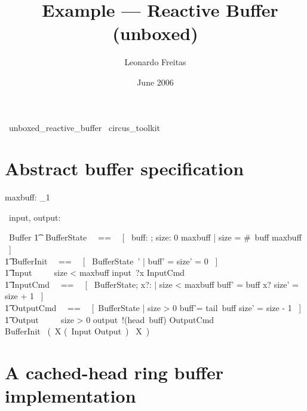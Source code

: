 \documentclass{article}
\begin{document}
\title{\Circus\ Example --- Reactive Buffer (unboxed)}
\author{Leonardo Freitas}
\date{June 2006}

\maketitle

\begin{zsection}
  \SECTION\ unboxed\_reactive\_buffer \parents\ circus\_toolkit
\end{zsection}

\section{Abstract buffer specification}

\begin{axdef}
  maxbuff: \nat_1
\end{axdef}

\begin{circus}
   \circchannel\ input, output: \nat
\end{circus}

\begin{circus}
  \circprocess\ Buffer \circdef \circbegin
  \also %
    \t1 \circstate\ BufferState ~~==~~ [~ buff: \seq \nat; size: 0 \upto maxbuff | size = \#~buff \leq maxbuff ~] \\ %
    \t1 BufferInit ~~==~~ [~ BufferState~' | buff' = \langle\rangle \land size' = 0 ~] \\
    \t1 Input ~~\circdef~~ \lcircguard size < maxbuff \rcircguard \circguard input~?x \then InputCmd \\
    \t1 InputCmd ~~==~~ [~ \Delta BufferState; x?: \nat | size < maxbuff \land buff' = buff \cat \langle x? \rangle \land size' = size + 1 ~] \\
    \t1 OutputCmd ~~==~~ [~\Delta BufferState | size > 0 \land buff'= tail~buff \land size' = size - 1 ~] \\
    \t1 Output ~~\circdef~~ \lcircguard size > 0 \rcircguard \circguard output~!(head~buff) \then OutputCmd \\
  \circspot BufferInit \circseq\ (~\circmu X \circspot (~Input \extchoice Output~) \circseq\ X~) \\
  \circend
\end{circus}


\section{A cached-head ring buffer implementation}
\end{document}
